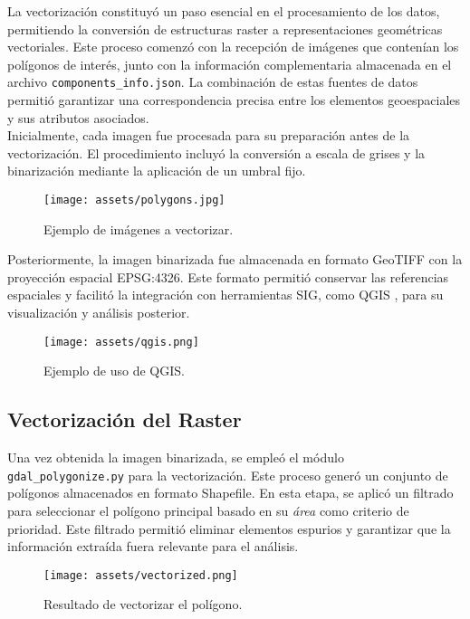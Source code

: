 \documentclass[twocolumn, fontsize=10pt]{article}
\begin{document}
La vectorización constituyó un paso esencial en el procesamiento de los datos, permitiendo la conversión de estructuras raster a representaciones geométricas vectoriales. Este proceso comenzó con la recepción de imágenes que contenían los polígonos de interés, junto con la información complementaria almacenada en el archivo \texttt{components\_info.json}. La combinación de estas fuentes de datos permitió garantizar una correspondencia precisa entre los elementos geoespaciales y sus atributos asociados.\\

Inicialmente, cada imagen fue procesada para su preparación antes de la vectorización. El procedimiento incluyó la conversión a escala de grises y la binarización mediante la aplicación de un umbral fijo. \\

\begin{figure}[H]
    \centering
    \texttt{[image: assets/polygons.jpg]}
    \caption{Ejemplo de imágenes a vectorizar.}
    \label{fig:polygons}
\end{figure}


Posteriormente, la imagen binarizada fue almacenada en formato GeoTIFF con la proyección espacial EPSG:4326. Este formato permitió conservar las referencias espaciales y facilitó la integración con herramientas SIG, como QGIS \cite{qgis}, para su visualización y análisis posterior.

\begin{figure}[H]
    \centering
    \texttt{[image: assets/qgis.png]}
    \caption{Ejemplo de uso de QGIS.}
    \label{fig:qgis}
\end{figure}

\subsection{Vectorización del Raster}

Una vez obtenida la imagen binarizada, se empleó el módulo \texttt{gdal\_polygonize.py} para la vectorización. Este proceso generó un conjunto de polígonos almacenados en formato Shapefile. En esta etapa, se aplicó un filtrado para seleccionar el polígono principal basado en su \textit{área} como criterio de prioridad. Este filtrado permitió eliminar elementos espurios y garantizar que la información extraída fuera relevante para el análisis.

\begin{figure}[H]
    \centering
    \texttt{[image: assets/vectorized.png]}
    \caption{Resultado de vectorizar el polígono.}
    \label{fig:vectorized}
\end{figure}
\end{document}
